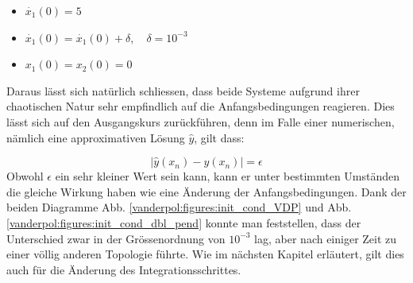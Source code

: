 \begin{itemize}
\item
$\dot{x_1}(0) = 5$
\item
$\dot{x_1}(0) = \dot{x_1}(0) + \delta, \quad \delta = 10^{-3}$ 
\item
$x_1(0) = x_2(0) = 0$
\end{itemize}
Daraus lässt sich natürlich schliessen, dass beide Systeme aufgrund ihrer chaotischen Natur sehr empfindlich auf die Anfangsbedingungen reagieren. Dies lässt sich auf den Ausgangskurs zurückführen, denn im Falle einer numerischen, nämlich eine approximativen Lösung $\hat{y}$, gilt dass:

\begin{equation} 
\mid \hat{y}(x_n) - y(x_n) \mid = \epsilon
\end{equation}
Obwohl $\epsilon$ ein sehr kleiner Wert sein kann, kann er unter bestimmten Umständen die gleiche Wirkung haben wie eine Änderung der Anfangsbedingungen. Dank der beiden Diagramme Abb.   \ref{vanderpol:figures:init_cond_VDP} und Abb. \ref{vanderpol:figures:init_cond_dbl_pend} konnte man feststellen, dass der Unterschied zwar in der Grössenordnung von $10^{-3}$ lag, aber nach einiger Zeit zu einer völlig anderen Topologie führte. Wie im nächsten Kapitel erläutert, gilt dies auch für die Änderung des Integrationsschrittes.